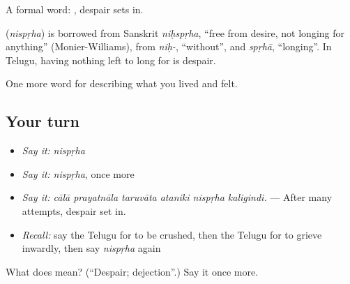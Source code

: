 A formal word:  , despair sets in.

\begin{cousinweb}
\textbf{} (\emph{nispṛha}) is borrowed from Sanskrit \emph{niḥspṛha}, \textquotedblleft{}free from desire, not longing for anything\textquotedblright{} (Monier-Williams), from \emph{niḥ-}, \textquotedblleft{}without\textquotedblright{}, and \emph{spṛhā}, \textquotedblleft{}longing\textquotedblright{}. In Telugu, having nothing left to long for is despair.
\end{cousinweb}

\begin{grammarlens}[title={What you've built}]
One more word for describing what you lived and felt.
\end{grammarlens}

\subsection*{Your turn}
\begin{itemize}
\raggedright
  \item \emph{Say it:} \emph{nispṛha}
  \item \emph{Say it:} \emph{nispṛha}, once more
  \item \emph{Say it:} \emph{cālā prayatnāla taruvāta ataniki nispṛha kaligindi.} — After many attempts, despair set in.
  \item \emph{Recall:} say the Telugu for to be crushed, then the Telugu for to grieve inwardly, then say \emph{nispṛha} again
\end{itemize}

\begin{tcolorbox}[breakable,colback=teal!4,colframe=teal!35!black,title={Before you move on}]
What does  mean? (\textquotedblleft{}Despair; dejection\textquotedblright{}.) Say it once more.
\end{tcolorbox}
